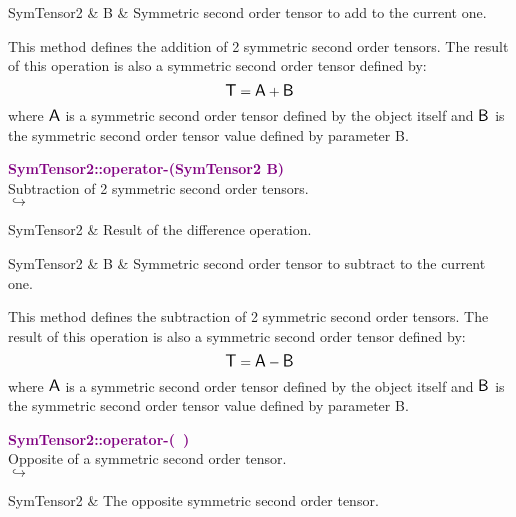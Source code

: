 \begin{tcolorbox}[width=\textwidth,myArgs,tabularx={ll|R}]
SymTensor2 & B & Symmetric second order tensor to add to the current one.
\end{tcolorbox}

This method defines the addition of 2 symmetric second order tensors.
The result of this operation is also a symmetric second order tensor defined by:
\begin{equation*}
\mbox{\large\ensuremath{\mathsf{T}}} = \mbox{\large\ensuremath{\mathsf{A}}} + \mbox{\large\ensuremath{\mathsf{B}}}
\end{equation*}
where $\mbox{\large\ensuremath{\mathsf{A}}}$ is a symmetric second order tensor defined by the object itself and $\mbox{\large\ensuremath{\mathsf{B}}}$ is the symmetric second order tensor value defined by parameter B.

\textcolor{purple}{\textbf{SymTensor2::operator-(SymTensor2 B)}}\label{SymTensor2::operator-(SymTensor2 B)}\\
Subtraction of 2 symmetric second order tensors.\\ \hspace*{5mm}$\hookrightarrow$
\vspace*{-2em}\begin{tcolorbox}[grow to left by=-1cm, width=\textwidth-1cm,myArgs,tabularx={l|R}]
SymTensor2 & Result of the difference operation.
\end{tcolorbox}

\begin{tcolorbox}[width=\textwidth,myArgs,tabularx={ll|R}]
SymTensor2 & B & Symmetric second order tensor to subtract to the current one.
\end{tcolorbox}

This method defines the subtraction of 2 symmetric second order tensors.
The result of this operation is also a symmetric second order tensor defined by:
\begin{equation*}
\mbox{\large\ensuremath{\mathsf{T}}} = \mbox{\large\ensuremath{\mathsf{A}}} - \mbox{\large\ensuremath{\mathsf{B}}}
\end{equation*}
where $\mbox{\large\ensuremath{\mathsf{A}}}$ is a symmetric second order tensor defined by the object itself and $\mbox{\large\ensuremath{\mathsf{B}}}$ is the symmetric second order tensor value defined by parameter B.

\textcolor{purple}{\textbf{SymTensor2::operator-(~)}}\label{SymTensor2::operator-()}\\
Opposite of a symmetric second order tensor.\\ \hspace*{5mm}$\hookrightarrow$
\vspace*{-2em}\begin{tcolorbox}[grow to left by=-1cm, width=\textwidth-1cm,myArgs,tabularx={l|R}]
SymTensor2 & The opposite symmetric second order tensor.
\end{tcolorbox}

